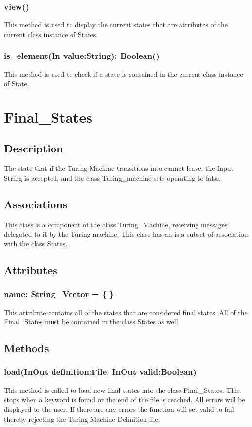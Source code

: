 \documentclass{report}
\begin{document}
      
      
    \subsubsection{view()}
    	This method is used to display the current states that are attributes of the current class instance of States.
    \subsubsection{is\_element(In value:String): Boolean()}
    	This method is used to check if a state is contained in the current class instance of State.
    
    
    
    
    
      \section{Final\_States}
	\subsection{Description}
    The state that if the Turing Machine transitions into cannot leave, the Input String is accepted, and the class Turing\_machine sets operating to false.
    \subsection{Associations} 
     This class is a component of the class Turing\_Machine, receiving messages delegated to it by the Turing machine.
     This class has an is a subset of association with the class States.
    \subsection{Attributes} 
    \subsubsection{name: String\_Vector = \{ \}}
    This attribute contains all of the states that are considered final states. All of the Final\_States must be contained in the class States as well.
    \subsection{Methods} 
     \subsubsection{load(InOut definition:File, InOut valid:Boolean)}
     This method is called to load new final states into the class Final\_States. This stops when a keyword is found or the end of the file is reached. All errors will be displayed to the user. If there are any errors the function will set valid to fail thereby rejecting the Turing Machine Definition file. 
\end{document}
